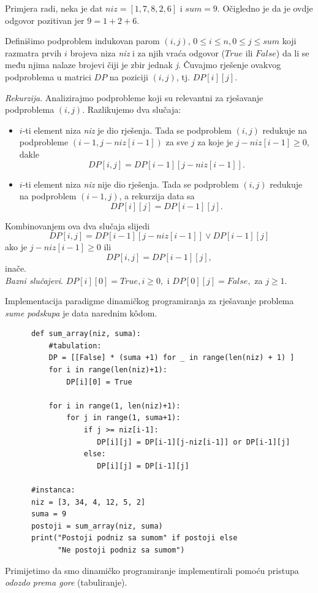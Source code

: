 \begin{solution}
	
	Primjera radi, neka je dat $niz=[1, 7, 8, 2, 6]$ i $sum=9$. Očigledno je da je ovdje odgovor pozitivan jer $9=1+2+6$.  
	
   Definišimo podproblem indukovan parom $(i, j)$, $0 \leq i \leq n, 0 \leq j \leq sum$ koji razmatra prvih $i$ brojeva niza \emph{niz} i za njih vraća odgovor ($True$ ili $False$) da li se među njima nalaze brojevi čiji je zbir jednak \emph{j}. Čuvajmo rješenje ovakvog podproblema u matrici $DP$ na poziciji $(i,j)$, tj. $DP[i][j]$.  \\ \vspace{0.15cm}
   
   \textit{Rekurzija}. Analizirajmo podprobleme koji su relevantni za rješavanje podproblema $(i,j)$. Razlikujemo dva slučaja:
   \begin{itemize}
   	\item $i$-ti element niza \emph{niz} je dio rješenja. Tada se podproblem $(i, j)$ redukuje na podprobleme $(i-1, j-niz[i-1])$ za sve $j$ za koje je  $j-niz[i-1]\geq  0$, dakle %
   	    $$ DP[i, j] =    DP[i-1][ j- niz[i-1] ]. $$ %
   	\item $i$-ti element niza \emph{niz} nije dio rješenja. Tada se podproblem $(i, j)$ redukuje na podproblem $(i-1, j)$, a rekurzija data sa 
   	$$ DP[i][j] = DP[i-1][j]. $$

   \end{itemize}
   Kombinovanjem ova dva slučaja slijedi
   $$DP[i, j] =   DP[i-1][ j- niz[i-1] ] \vee DP[i-1][j] $$ ako je  $j- niz[i-1]\geq 0$ ili  
     $$DP[i, j] =  DP[i-1][j],$$ inače. \\  
   \textit{Bazni slučajevi}. $DP[i][0] = True, i \geq 0,$ i $DP[0][j] = False,$ za $ j \geq 1$. 
   
    Implementacija paradigme dinamičkog programiranja za rješavanje pro\-blema \emph{sume podskupa} je data narednim k\^odom. 
   
   \begin{verbatim}
   	  def sum_array(niz, suma):
   	      #tabulation:
   	      DP = [[False] * (suma +1) for _ in range(len(niz) + 1) ]
   	      for i in range(len(niz)+1):
   	          DP[i][0] = True
   	      
   	      for i in range(1, len(niz)+1):   
   	          for j in range(1, suma+1):
   	              if j >= niz[i-1]:
   	                 DP[i][j] = DP[i-1][j-niz[i-1]] or DP[i-1][j]
   	              else:
   	                 DP[i][j] = DP[i-1][j]
   	  
   	  #instanca:
   	  niz = [3, 34, 4, 12, 5, 2]
   	  suma = 9
   	  postoji = sum_array(niz, suma)
   	  print("Postoji podniz sa sumom" if postoji else  
   	        "Ne postoji podniz sa sumom")
   \end{verbatim}
\end{solution}
Primijetimo da smo dinamičko programiranje implementirali pomoću pristupa \textit{odozdo prema gore} (tabuliranje). 


